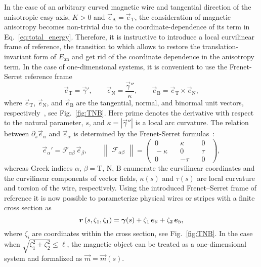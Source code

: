 In the case of an arbitrary curved magnetic wire and tangential direction of the anisotropic easy-axis, $K>0$ and $\vec{e}_\mathrm{A} = \vec{e}_\mathrm{T}$, the consideration of magnetic anisotropy becomes non-trivial due to the coordinate-dependence of its term in Eq.~\eqref{eq:total_energy}. Therefore, it is instructive to introduce a local curvilinear frame of reference, the transition to which allows to restore the translation-invariant form of $E_\textrm{an}$ and get rid of the coordinate dependence in the anisotropy term. In the case of one-dimensional systems, it is convenient to use the Frenet-Serret reference frame  
\begin{equation} \label{eq:Frenet-Serret}
		\vec{e}_\mathrm{T} = \vec{\gamma}', \qquad  \vec{e}_\mathrm{N} = \dfrac{\vec{\gamma}''}{\kappa} , \qquad  \vec{e}_\mathrm{B} = \vec{e}_\mathrm{T} \times \vec{e}_\mathrm{N},
\end{equation}
where $\vec{e}_\textrm{T}$, $\vec{e}_\textrm{N}$, and $\vec{e}_\textrm{B}$ are the tangential, normal, and binormal unit vectors, respectively~\cite{Kreyszig91}, see Fig.~\ref{fig:TNB}. Here prime denotes the derivative with respect to the natural parameter, $s$, and $\kappa = |\vec{\gamma}''|$  is a local arc curvature. The relation between $\partial_{s} \vec{e}_{\alpha}$ and $\vec{e}_{\alpha}$ is determined by the Frenet-Serret formulas~\cite{Kreyszig91}:
\begin{equation} \label{eq:Darboux_vector}
	\vec{e}_{\alpha}' = \mathcal{F}_{\alpha \beta} \, \vec{e}_{\beta}, \qquad \begin{Vmatrix} \mathcal{F}_{\alpha \beta} \end{Vmatrix} = \left(\begin{matrix*} \, 0 \quad	& \kappa \quad &  0 \, \, \, \\ \, -\kappa \quad & 0 \quad & \tau \, \, \, \\
	\, 0 \quad & -\tau \quad &	0 \, \, \,
	\end{matrix*}\right),	
\end{equation}
whereas Greek indices $\alpha,\, \beta = \textrm{T},\, \textrm{N},\, \textrm{B}$ enumerate the curvilinear coordinates and the curvilinear components of vector fields, $\kappa(s)$ and $\tau(s)$ are local curvature and torsion of the wire, respectively. Using the introduced Frenet--Serret frame of reference it is now possible to parameterize physical wires or stripes with a finite cross section as
\begin{equation} \label{eq:Stripe_param}
\vec{r}\left(s,\zeta_1,\zeta_1\right)=\vec{\gamma}(s) + \zeta_1 \, \vec{e}_\textsc{n}+\zeta_2 \, \vec{e}_\textsc{b},
\end{equation}
where $\zeta_i$ are coordinates within the cross section, see Fig.~\ref{fig:TNB}. In the case when $\sqrt{\zeta_1^2+\zeta_2^2}\leq \ell$, the magnetic object can be treated as a one-dimensional system and formalized as $\vec{m}=\vec{m}(s)$.

